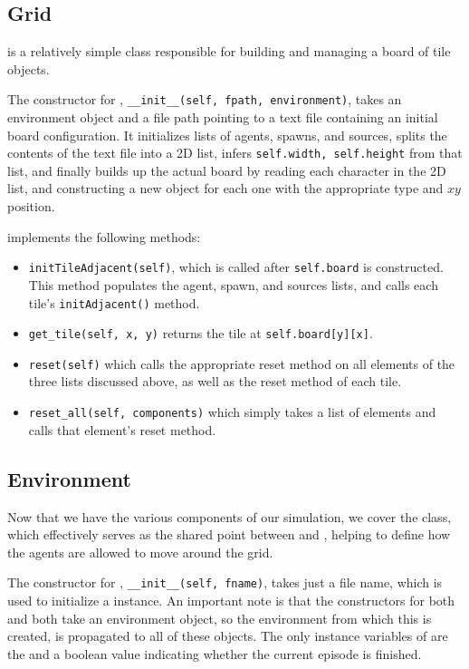 \documentclass[11pt]{article}
\begin{document}
\subsection{Grid}

 is a relatively simple class responsible for building and managing a board of tile objects.

The constructor for , \texttt{__init__(self, fpath, environment)}, takes an environment object and a file path pointing to a text file containing an initial board configuration. It initializes lists of agents, spawns, and sources, splits the contents of the text file into a 2D list, infers \texttt{self.width, self.height} from that list, and finally builds up the actual board by reading each character in the 2D list, and constructing a new  object for each one with the appropriate type and $xy$ position.

 implements the following methods:

\begin{itemize}
\item \texttt{initTileAdjacent(self)}, which is called after \texttt{self.board} is constructed. This method populates the agent, spawn, and sources lists, and calls each tile's \texttt{initAdjacent()} method.
\item \texttt{get_tile(self, x, y)} returns the tile at \texttt{self.board[y][x]}.
\item \texttt{reset(self)} which calls the appropriate reset method on all elements of the three lists discussed above, as well as the reset method of each tile.
\item \texttt{reset_all(self, components)} which simply takes a list of elements and calls that element's reset method.
\end{itemize}

\subsection{Environment}

Now that we have the various components of our simulation, we cover the  class, which effectively serves as the shared point between  and , helping to define how the agents are allowed to move around the grid.

The constructor for , \texttt{__init__(self, fname)}, takes just a file name, which is used to initialize a  instance. An important note is that the constructors for both  and  both take an environment object, so the environment from which this  is created, is propagated to all of these objects. The only instance variables of  are the  and a boolean value indicating whether the current episode is finished.
\end{document}
